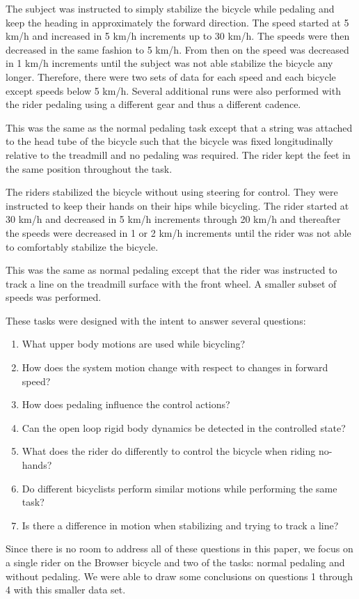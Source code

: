\begin{description}
 \item[Normal pedaling] The subject was instructed to simply stabilize the
     bicycle while pedaling and keep the heading in approximately the forward
     direction. The speed started at 5 km/h and increased in 5 km/h increments
     up to 30 km/h. The speeds were then decreased in the same fashion to 5
     km/h. From then on the speed was decreased in 1 km/h increments until the
     subject was not able stabilize the bicycle any longer. Therefore, there
     were two sets of data for each speed and each bicycle except speeds below
     5 km/h. Several additional runs were also performed with the rider
     pedaling using a different gear and thus a different cadence.
 \item[Without pedaling] This was the same as the normal pedaling task except
     that a string was attached to the head tube of the bicycle such that the
     bicycle was fixed longitudinally relative to the treadmill and no pedaling
     was required. The rider kept the feet in the same position throughout the
     task.
 \item[No-hands] The riders stabilized the bicycle without using steering for
     control. They were instructed to keep their hands on their hips while
     bicycling. The rider started at 30 km/h and decreased in 5 km/h increments
     through 20 km/h and thereafter the speeds were decreased in 1 or 2 km/h
     increments until the rider was not able to comfortably stabilize the
     bicycle.
 \item[Line tracking] This was the same as normal pedaling except that the
     rider was instructed to track a line on the treadmill surface with the
     front wheel. A smaller subset of speeds was performed.
\end{description}
These tasks were designed with the intent to answer several questions:
\begin{enumerate}
    \item What upper body motions are used while bicycling?
    \item How does the system motion change with respect to changes in forward speed?
    \item How does pedaling influence the control actions?
    \item Can the open loop rigid body dynamics be detected in the controlled state?
    \item What does the rider do differently to control the bicycle when riding no-hands?
    \item Do different bicyclists perform similar motions while performing the same task?
    \item Is there a difference in motion when stabilizing and trying to track a line?
\end{enumerate}
Since there is no room to address all of these questions in this paper, we
focus on a single rider on the Browser bicycle and two of the tasks: normal
pedaling and without pedaling. We were able to draw some conclusions on
questions 1 through 4 with this smaller data set.

